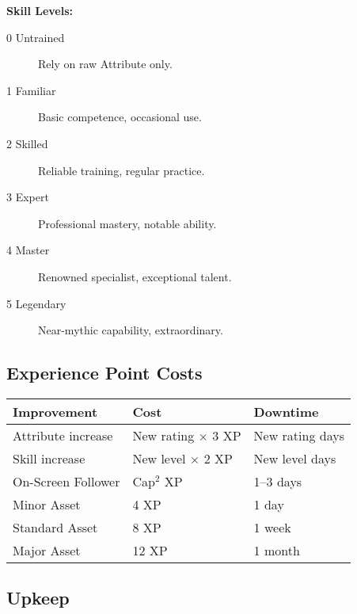 \textbf{Skill Levels:}
\begin{description}
\item[0 Untrained] Rely on raw Attribute only.
\item[1 Familiar] Basic competence, occasional use.
\item[2 Skilled] Reliable training, regular practice.
\item[3 Expert] Professional mastery, notable ability.
\item[4 Master] Renowned specialist, exceptional talent.
\item[5 Legendary] Near-mythic capability, extraordinary.
\end{description}

\subsection{Experience Point Costs}
\label{subsec:xp-costs-ref}

\begin{center}
\feTableStart
\begin{tabularx}{\linewidth}{@{}l l l @{}}
\toprule
\textbf{Improvement} & \textbf{Cost} & \textbf{Downtime} \\
\midrule
Attribute increase & New rating $\times$ 3 XP & New rating days \\
Skill increase & New level $\times$ 2 XP & New level days \\
On-Screen Follower & Cap$^2$ XP & 1--3 days \\
Minor Asset & 4 XP & 1 day \\
Standard Asset & 8 XP & 1 week \\
Major Asset & 12 XP & 1 month \\
\bottomrule
\end{tabularx}
\feTableEnd
\end{center}



\subsection*{Upkeep}\label{sec:upkeep-srd}

